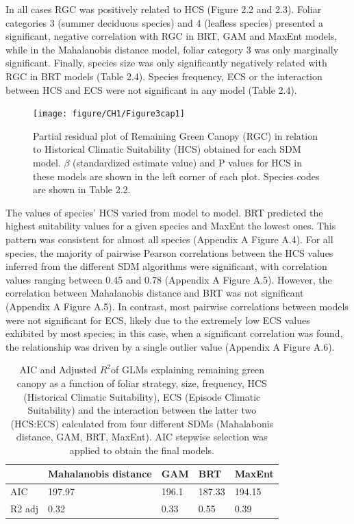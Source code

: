\documentclass[11pt,twoside]{reedthesis}
\begin{document}
In all cases RGC was positively related to HCS (Figure 2.2 and 2.3).
Foliar categories 3 (summer deciduous species) and 4 (leafless species)
presented a significant, negative correlation with RGC in BRT, GAM and
MaxEnt models, while in the Mahalanobis distance model, foliar category
3 was only marginally significant. Finally, species size was only
significantly negatively related with RGC in BRT models (Table 2.4).
Species frequency, ECS or the interaction between HCS and ECS were not
significant in any model (Table 2.4).\par

\setlength{\abovecaptionskip}{10pt}
\begin{figure}[hbt!]

{\centering \texttt{[image: figure/CH1/Figure3cap1]} 

}

\caption[Partial residual plot of Remaining Green Canopy (RGC) in relation to Historical Climatic Suitability (HCS)]{Partial residual plot of Remaining Green Canopy (RGC) in relation to Historical Climatic Suitability (HCS) obtained for each SDM model. $\beta$ (standardized estimate value) and P values for HCS in these models are shown in the left corner of each plot. Species codes are shown in Table 2.2.}\label{fig:Ch1plot3}
\end{figure}
The values of species' HCS varied from model to model. BRT predicted the
highest suitability values for a given species and MaxEnt the lowest
ones. This pattern was consistent for almost all species (Appendix A
Figure A.4). For all species, the majority of pairwise Pearson
correlations between the HCS values inferred from the different SDM
algorithms were significant, with correlation values ranging between
0.45 and 0.78 (Appendix A Figure A.5). However, the correlation between
Mahalanobis distance and BRT was not significant (Appendix A Figure
A.5). In contrast, most pairwise correlations between models were not
significant for ECS, likely due to the extremely low ECS values
exhibited by most species; in this case, when a significant correlation
was found, the relationship was driven by a single outlier value
(Appendix A Figure A.6).\par
\newpage
\begin{table}[H]

\caption[AIC and Adjusted $R^2$ of GLMs explaining remaining green canopy]{\label{tab:unnamed-chunk-3}AIC and Adjusted $R^2$of GLMs explaining remaining green canopy as a function of foliar strategy, size, frequency, HCS (Historical Climatic Suitability), ECS (Episode Climatic Suitability) and the interaction between the latter two (HCS:ECS) calculated from four different SDMs (Mahalabonis distance, GAM, BRT, MaxEnt). AIC stepwise selection was applied to obtain the final models.}
\centering
\fontsize{8}{10}\selectfont
\begin{tabular}[t]{lllll}
\toprule
 & Mahalanobis distance & GAM & BRT & MaxEnt\\
\midrule
AIC & 197.97 & 196.1 & 187.33 & 194.15\\
R2 adj & 0.32 & 0.33 & 0.55 & 0.39\\
\bottomrule
\end{tabular}
\end{table}
\end{document}
